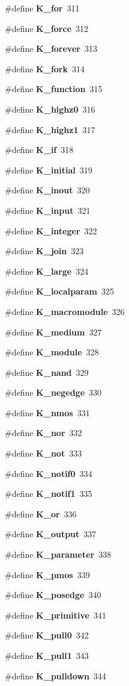\begin{CompactItemize}
\#define {\bf K\_\-for}\ 311
\item 
\#define {\bf K\_\-force}\ 312
\item 
\#define {\bf K\_\-forever}\ 313
\item 
\#define {\bf K\_\-fork}\ 314
\item 
\#define {\bf K\_\-function}\ 315
\item 
\#define {\bf K\_\-highz0}\ 316
\item 
\#define {\bf K\_\-highz1}\ 317
\item 
\#define {\bf K\_\-if}\ 318
\item 
\#define {\bf K\_\-initial}\ 319
\item 
\#define {\bf K\_\-inout}\ 320
\item 
\#define {\bf K\_\-input}\ 321
\item 
\#define {\bf K\_\-integer}\ 322
\item 
\#define {\bf K\_\-join}\ 323
\item 
\#define {\bf K\_\-large}\ 324
\item 
\#define {\bf K\_\-localparam}\ 325
\item 
\#define {\bf K\_\-macromodule}\ 326
\item 
\#define {\bf K\_\-medium}\ 327
\item 
\#define {\bf K\_\-module}\ 328
\item 
\#define {\bf K\_\-nand}\ 329
\item 
\#define {\bf K\_\-negedge}\ 330
\item 
\#define {\bf K\_\-nmos}\ 331
\item 
\#define {\bf K\_\-nor}\ 332
\item 
\#define {\bf K\_\-not}\ 333
\item 
\#define {\bf K\_\-notif0}\ 334
\item 
\#define {\bf K\_\-notif1}\ 335
\item 
\#define {\bf K\_\-or}\ 336
\item 
\#define {\bf K\_\-output}\ 337
\item 
\#define {\bf K\_\-parameter}\ 338
\item 
\#define {\bf K\_\-pmos}\ 339
\item 
\#define {\bf K\_\-posedge}\ 340
\item 
\#define {\bf K\_\-primitive}\ 341
\item 
\#define {\bf K\_\-pull0}\ 342
\item 
\#define {\bf K\_\-pull1}\ 343
\item 
\#define {\bf K\_\-pulldown}\ 344

\end{CompactItemize}

